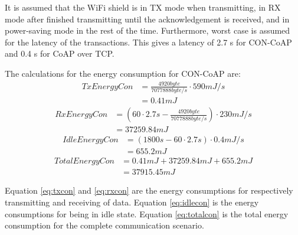 It is assumed that the WiFi shield is in TX mode when transmitting, in RX mode after finished transmitting until the acknowledgement is received, and in power-saving mode in the rest of the time. Furthermore, worst case is assumed for the latency of the transactions. This gives a latency of 2.7 s for CON-CoAP and 0.4 s for CoAP over TCP.

The calculations for the energy consumption for CON-CoAP are:
\begin{equation}\label{eq:txcon}
\begin{aligned}
TxEnergyCon &= \frac{4920 byte}{7077888 byte/s } \cdot 590 mJ/s 
\\&= 0.41 mJ   
\end{aligned}
\end{equation}
\begin{equation}\label{eq:rxcon}
\begin{aligned}
RxEnergyCon &= \left( 60 \cdot 2.7 s - \frac{4920 byte}{7077888 byte/s } \right) \cdot 230 mJ/s 
\\&= 37259.84 mJ   
\end{aligned}
\end{equation}
\begin{equation}\label{eq:idlecon}
\begin{aligned}
IdleEnergyCon &= (1800 s - 60 \cdot 2.7 s) \cdot 0.4 mJ/s 
\\&= 655.2 mJ   
\end{aligned}
\end{equation}
\begin{equation}\label{eq:totalcon}
\begin{aligned}
TotalEnergyCon &= 0.41 mJ + 37259.84 mJ +655.2 mJ 
\\&= 37915.45 mJ %
\end{aligned}
\end{equation}

Equation \ref{eq:txcon} and \ref{eq:rxcon} are the energy consumptions for respectively transmitting and receiving of data. Equation \ref{eq:idlecon} is the energy consumptions for being in idle state.
Equation \ref{eq:totalcon} is the total energy consumption for the complete communication scenario.

